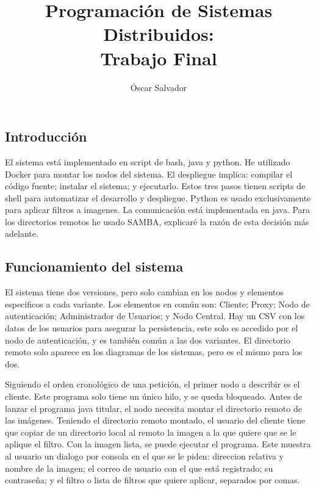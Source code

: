 \documentclass{article}
\title{\textbf{Programación de Sistemas Distribuidos:\\Trabajo Final}}
\author{Óscar Salvador}
\begin{document}
\maketitle
\clearpage
\tableofcontents


\begin{flushleft}
	\clearpage
	\section{Introducción}
	El sistema está implementado en script de bash, java y python. He utilizado Docker para montar los nodos del sistema. El despliegue implica: compilar el código fuente; instalar el sistema; y ejecutarlo. Estos tres pasos tienen scripts de shell para automatizar el desarrollo y despliegue. Python es usado exclusivamente para aplicar filtros a imagenes. La comunicación está implementada en java. Para los directorios remotos he usado SAMBA, explicaré la razón de esta decisión más adelante.
	
		\subsection{Funcionamiento del sistema}
		El sistema tiene dos versiones, pero solo cambian en los nodos y elementos especificos a cada variante. Los elementos en común son: Cliente; Proxy; Nodo de autenticación; Administrador de Usuarios; y Nodo Central. Hay un CSV con los datos de los usuarios para asegurar la persistencia, este solo es accedido por el nodo de autenticación, y es también común a las dos variantes. El directorio remoto solo aparece en los diagramas de los sistemas, pero es el mismo para los dos.
		\linebreak
		
		\hspace*{2cm}
		
		Siguiendo el orden cronológico de una petición, el primer nodo a describir es el cliente. Este programa solo tiene un único hilo, y se queda bloqueado. Antes de lanzar el programa java titular, el nodo necesita montar el directorio remoto de las imágenes. Teniendo el directorio remoto montado, el usuario del cliente tiene que copiar de un directorio local al remoto la imagen a la que quiere que se le aplique el filtro. Con la imagen lista, se puede ejecutar el programa. Este muestra al usuario un dialogo por consola en el que se le piden: direccion relativa y nombre de la imagen; el correo de usuario con el que está registrado; su contraseña; y el filtro o lista de filtros que quiere aplicar, separados por comas.
		\linebreak
		

\end{flushleft}
\end{document}
